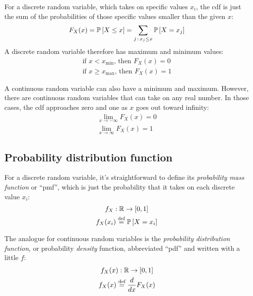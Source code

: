 For a discrete random variable, which takes on specific values $x_i$, the cdf is
just the sum of the probabilities of those specific values smaller than the
given $x$:
\begin{equation*}
F_X(x) = \mathbb{P}\left[{X \leq x}\right] = \sum_{j \,:\, x_j \leq x} \mathbb{P}\left[{X = x_j}\right]
\end{equation*}
A discrete random variable therefore has maximum and minimum values:
\begin{gather}
\text{if } x < x_\mathrm{min} \text{, then } F_X(x) = 0 \\
\text{if } x \geq x_\mathrm{max} \text{, then } F_X(x) = 1
\end{gather}


A continuous random variable can also have a minimum and maximum. However,
there are continuous random variables that can take on any real number. In
those cases, the cdf approaches zero and one as $x$ goes out toward infinity:
\begin{gather}
\lim_{x \to -\infty} F_X(x) = 0 \\
\lim_{x \to \infty} F_X(x) = 1
\end{gather}


\subsection{Probability distribution function}

For a discrete random variable, it's straightforward to define its
\emph{probability mass function} or ``pmf'', which is just the probability
that it takes on each discrete value $x_i$:
\begin{gather*}
f_X : \mathbb{R} \to [0, 1] \\
f_X(x_i) \stackrel{\text{def}}{=} \mathbb{P}\left[{X = x_i}\right]
\end{gather*}

The analogue for continuous random variables is the \emph{probability
distribution function}, or probability \emph{density} function,
abbreviated ``pdf'' and written with a little $f$:
\begin{gather*}
f_X(x) : \mathbb{R} \to [0, 1] \\
f_X(x) \stackrel{\text{def}}{=} \frac{d}{dx} F_X(x)
\end{gather*}

